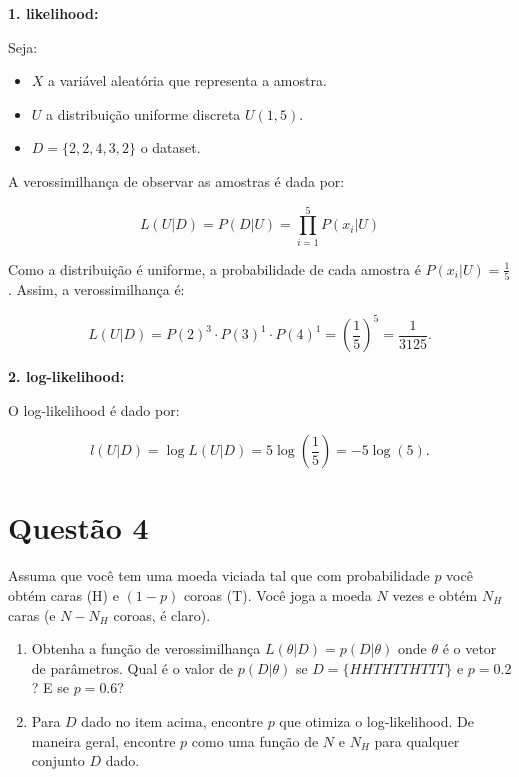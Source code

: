 \documentclass[12 pt]{article}
\begin{document}
\begin{tcolorbox}[colback=white, colframe=black, title=Resposta:]
    \textbf{1. likelihood:}

    Seja:
    \begin{itemize}
        \item  \( X \) a variável aleatória que representa a amostra.
        \item \( U \) a distribuição uniforme discreta \( U(1, 5) \).
        \item  \( D = \{2, 2, 4, 3, 2\} \) o dataset.
    \end{itemize} 
    
    A verossimilhança de observar as amostras é dada por:
    
    \[
    L(U | D) = P(D | U) = \prod_{i=1}^{5} P(x_i | U)
    \]

    Como a distribuição é uniforme, a probabilidade de cada amostra é \( P(x_i | U ) = \frac{1}{5} \). Assim, a verossimilhança é:
    
    \[
        L(U | D) = P(2)^{3} \cdot P(3)^{1} \cdot P(4)^{1} = \left(\frac{1}{5}\right)^{5} = \frac{1}{3125}.
    \]

    \textbf{2. log-likelihood:}

    O log-likelihood é dado por:
    
    \[
    l(U | D) = \log L(U | D) = 5 \log\left(\frac{1}{5}\right) = -5 \log(5).
    \]
    

\end{tcolorbox}

\section*{Questão 4}
Assuma que você tem uma moeda viciada tal que com probabilidade $p$ você obtém caras (H) e $(1 - p)$ coroas (T). Você joga a moeda $N$ vezes e obtém $N_H$ caras (e $N - N_H$ coroas, é claro).
\begin{enumerate}
    \item Obtenha a função de verossimilhança $L(\theta|D) = p(D|\theta)$ onde $\theta$ é o vetor de parâmetros. Qual é o valor de $p(D|\theta)$ se $D = \{HHT HT T HT T T\}$ e $p = 0.2$? E se $p = 0.6$?
    \item Para $D$ dado no item acima, encontre $p$ que otimiza o log-likelihood. De maneira geral, encontre $p$ como uma função de $N$ e $N_H$ para qualquer conjunto $D$ dado.
\end{enumerate}
\end{document}
